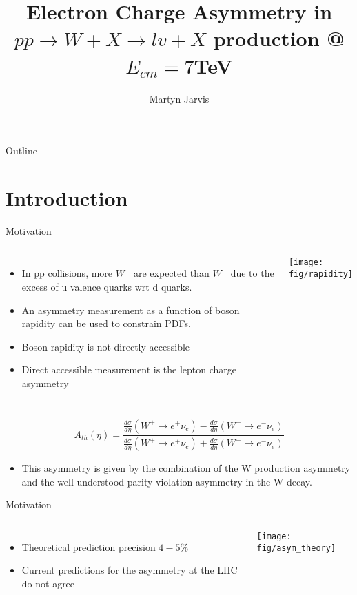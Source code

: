 \documentclass[t, 8pt]{beamer}
\author{Martyn Jarvis}
\title[Electron Charge Asymmetry]{Electron Charge Asymmetry in $pp \to W+X \to
lv + X$ production @ $E_{cm} = 7$TeV}
\begin{document}
\begin{frame}
  \titlepage
\end{frame}

\begin{frame}{Outline}
  \tableofcontents
\end{frame}

\section{Introduction}

\begin{frame}{Motivation}
  \begin{columns}[c]
  \begin{itemize}
    \item In pp collisions, more $W^+$ are expected than $W^-$ due to the excess of u valence quarks wrt d quarks.
    \item An asymmetry measurement as a function of boson rapidity can be used to constrain PDFs.
    \item Boson rapidity is not directly accessible
    \item Direct accessible measurement is the lepton charge asymmetry
  \end{itemize}
    \texttt{[image: fig/rapidity]}
  \end{columns}

    \begin{equation}
    A_{th}(\eta) = \frac{\frac{d\sigma}{d\eta}(W^{+}\to e^{+}\nu_{e}) - \frac{d\sigma}{d\eta}(W^{-}\to e^{-}\nu_{e})}
                        {\frac{d\sigma}{d\eta}(W^{+}\to e^{+}\nu_{e}) + \frac{d\sigma}{d\eta}(W^{-}\to e^{-}\nu_{e})}
    \end{equation}
  \begin{itemize}
    \item This asymmetry is given by the combination of the W production asymmetry and the well understood parity violation asymmetry in the W decay.
  \end{itemize}
\end{frame}

\begin{frame}{Motivation}
  \begin{columns}[c]
  \begin{itemize}
    \item Theoretical prediction precision $4-5 \%$
    \item Current predictions for the asymmetry at the LHC do not agree
  \end{itemize}
    \texttt{[image: fig/asym\_theory]}
  \end{columns}
\end{frame}
\end{document}
